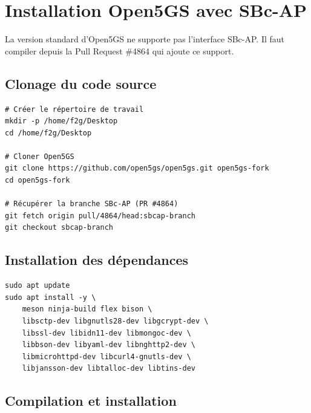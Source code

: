 \documentclass[11pt,a4paper]{article}
\begin{document}
\newpage

\section{Installation Open5GS avec SBc-AP}

\begin{warnbox}
La version standard d'Open5GS ne supporte pas l'interface SBc-AP. Il faut compiler depuis la Pull Request \#4864 qui ajoute ce support.
\end{warnbox}

\subsection{Clonage du code source}

\begin{cmdbox}
\begin{lstlisting}[style=bashstyle]
# Créer le répertoire de travail
mkdir -p /home/f2g/Desktop
cd /home/f2g/Desktop

# Cloner Open5GS
git clone https://github.com/open5gs/open5gs.git open5gs-fork
cd open5gs-fork

# Récupérer la branche SBc-AP (PR #4864)
git fetch origin pull/4864/head:sbcap-branch
git checkout sbcap-branch
\end{lstlisting}
\end{cmdbox}

\subsection{Installation des dépendances}

\begin{cmdbox}
\begin{lstlisting}[style=bashstyle]
sudo apt update
sudo apt install -y \
    meson ninja-build flex bison \
    libsctp-dev libgnutls28-dev libgcrypt-dev \
    libssl-dev libidn11-dev libmongoc-dev \
    libbson-dev libyaml-dev libnghttp2-dev \
    libmicrohttpd-dev libcurl4-gnutls-dev \
    libjansson-dev libtalloc-dev libtins-dev
\end{lstlisting}
\end{cmdbox}

\subsection{Compilation et installation}
\end{document}
